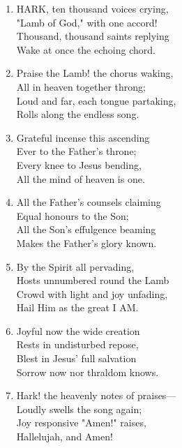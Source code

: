 \documentclass[11pt,a4paper]{article}
\begin{document}
\begin{enumerate}
    \item HARK, ten thousand voices crying, \\
        "Lamb of God," with one accord! \\
        Thousand, thousand saints replying \\
        Wake at once the echoing chord.

    \item Praise the Lamb! the chorus waking, \\
        All in heaven together throng; \\
        Loud and far, each tongue partaking, \\
        Rolls along the endless song.

    \item Grateful incense this ascending \\
        Ever to the Father's throne; \\
        Every knee to Jesus bending, \\
        All the mind of heaven is one.

    \item All the Father's counsels claiming \\
        Equal honours to the Son; \\
        All the Son's effulgence beaming \\
        Makes the Father's glory known.

    \item By the Spirit all pervading, \\
        Hosts unnumbered round the Lamb \\
        Crowd with light and joy unfading, \\
        Hail Him as the great I AM.

    \item Joyful now the wide creation \\
        Rests in undisturbed repose, \\
        Blest in Jesus' full salvation \\
        Sorrow now nor thraldom knows.

    \item Hark! the heavenly notes of praises--- \\
        Loudly swells the song again; \\
        Joy responsive "Amen!" raises, \\
        Hallelujah, and Amen!

\end{enumerate}
\end{document}
